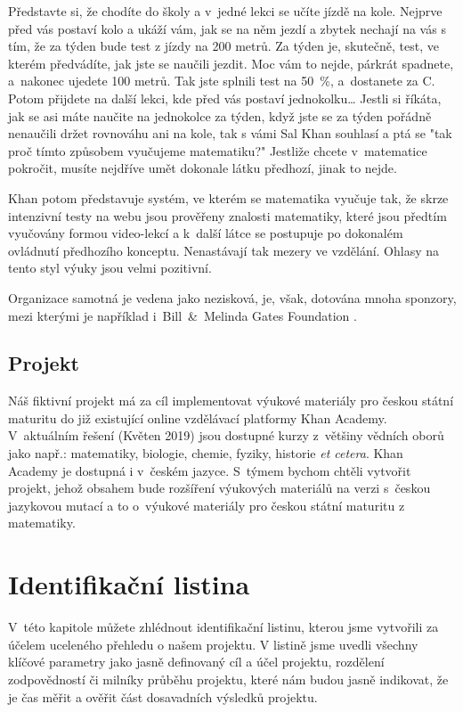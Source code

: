 \documentclass[12pt, a4paper]{report}
\begin{document}
Představte si, že chodíte do školy a v jedné lekci se učíte jízdě na kole.
Nejprve před vás postaví kolo a ukáží vám, jak se na něm jezdí a zbytek nechají
na vás s tím, že za týden bude test z jízdy na 200 metrů. Za týden je, skutečně,
test, ve kterém předvádíte, jak jste se naučili jezdit. Moc vám to nejde,
párkrát spadnete, a nakonec ujedete 100 metrů. Tak jste splnili test na 50 \%,
a dostanete za C. Potom přijdete na další lekci, kde před vás postaví
jednokolku\ldots{} Jestli si říkáta, jak se asi máte naučite na jednokolce za týden,
když jste se za týden pořádně nenaučili držet rovnováhu ani na kole, tak s vámi
Sal Khan souhlasí a ptá se "tak proč tímto způsobem vyučujeme matematiku?"
Jestliže chcete v matematice pokročit, musíte nejdříve umět dokonale látku
předhozí, jinak to nejde. \parencite{khan_ted_mastery}

Khan potom představuje systém, ve kterém se matematika vyučuje tak, že skrze
intenzivní testy na webu jsou prověřeny znalosti matematiky, které jsou předtím
vyučovány formou video-lekcí a k další látce se postupuje po dokonalém ovládnutí
předhozího konceptu. Nenastávají tak mezery ve vzdělání. Ohlasy na tento styl
výuky jsou velmi pozitivní.

Organizace samotná je vedena jako nezisková, je, však,
dotována mnoha sponzory, mezi kterými je například i Bill \& Melinda Gates
Foundation \parencite{khan_academy_supp}.


\section{Projekt}
\label{sec:org11ba50a}

Náš fiktivní projekt má za cíl implementovat výukové materiály pro českou
státní maturitu do již existující online vzdělávací platformy Khan Academy.
V aktuálním řešení (Květen 2019) jsou dostupné kurzy z většiny vědních oborů
jako např.: matematiky, biologie, chemie, fyziky, historie \emph{et cetera}. Khan
Academy je dostupná i v českém jazyce. S týmem bychom chtěli vytvořit projekt,
jehož obsahem bude rozšíření výukových materiálů na verzi s českou jazykovou
mutací a to o výukové materiály pro českou státní maturitu z matematiky.

\chapter{Identifikační listina}
\label{sec:org2057d4d}
V této kapitole můžete zhlédnout identifikační listinu, kterou jsme vytvořili za
účelem uceleného přehledu o našem projektu. V listině jsme uvedli všechny
klíčové parametry jako jasně definovaný cíl a účel projektu, rozdělení
zodpovědností či milníky průběhu projektu, které nám budou jasně indikovat, že
je čas měřit a ověřit část dosavadních výsledků projektu.
\end{document}
